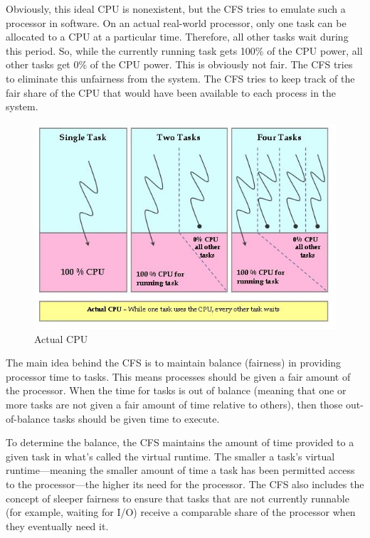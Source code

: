 \documentclass{article}
\begin{document}
Obviously, this ideal CPU is nonexistent, but the CFS tries to emulate such a processor in software. On an actual real-world processor, only one task can be allocated to a CPU at a particular time. Therefore, all other tasks wait during this period. So, while the currently running task gets 100\% of the CPU power, all other tasks get 0\% of the CPU power. This is obviously not fair. The CFS tries to eliminate this unfairness from the system. The CFS tries to keep track of the fair share of the CPU that would have been available to each process in the system.

\begin{figure}[H]
  \center
  \includegraphics[width=0.7\columnwidth]{./pics/cpu1.jpg}
  \caption{Actual CPU}
  \label{fig:Actual CPU}
\end{figure}

The main idea behind the CFS is to maintain balance (fairness) in providing processor time to tasks. This means processes should be given a fair amount of the processor. When the time for tasks is out of balance (meaning that one or more tasks are not given a fair amount of time relative to others), then those out-of-balance tasks should be given time to execute.

To determine the balance, the CFS maintains the amount of time provided to a given task in what's called the virtual runtime. The smaller a task's virtual runtime—meaning the smaller amount of time a task has been permitted access to the processor—the higher its need for the processor. The CFS also includes the concept of sleeper fairness to ensure that tasks that are not currently runnable (for example, waiting for I/O) receive a comparable share of the processor when they eventually need it.
\end{document}
